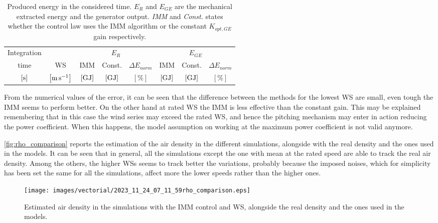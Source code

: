 \begin{table}[!htbp]
  \caption{Produced energy in the considered time. $E_R$ and $E_{GE}$ are the mechanical extracted energy and the generator output. \textit{IMM} and \textit{Const.} states whether the control law uses the IMM algorithm or the constant $K_{opt,GE}$ gain respectively.}
  \centering
  \begin{tabular}{cc|ccc|ccc}
    \toprule
    Integration & & \multicolumn{3}{c|}{$E_R$} & \multicolumn{3}{c}{$E_{GE}$}\\
    time & WS & IMM & Const. & $\Delta E_{norm}$ & IMM & Const. & $\Delta E_{norm}$\\
    $\left[\si{\second}\right]$ & $\left[\si{\meter\per\second}\right]$ & $\left[\si{\giga\joule}\right]$ &   $\left[\si{\giga\joule}\right]$ & $\left[\%\right]$& $\left[\si{\giga\joule}\right]$ &   $\left[\si{\giga\joule}\right]$ & $\left[\%\right]$ \\
    \midrule
    
  \end{tabular}
  \label{tab:comparison_IMM}
\end{table}

From the numerical values of the error, it can be seen that the difference between the methods for the lowest WS are small, even tough the IMM seems to perform better. On the other hand at rated WS the IMM is less effective than the constant gain. This may be explained remembering that in this case the wind series may exceed the rated WS, and hence the pitching mechanism may enter in action reducing the power coefficient. When this happens, the model assumption on working at the maximum power coefficient is not valid anymore.

\autoref{fig:rho_comparison} reports the estimation of the air density in the different simulations, alongside with the real density and the ones used in the models. It can be seen that in general, all the simulations except the one with mean at the rated speed are able to track the real air density. Among the others, the higher WSs seems to track better the variations, probably because the imposed noises, which for simplicity has been set the same for all the simulations, affect more the lower speeds rather than the higher ones.
\begin{figure}[!htbp]
  \centering
  \texttt{[image: images/vectorial/2023\_11\_24\_07\_11\_59rho\_comparison.eps]}
  \caption{Estimated air density in the simulations with the IMM control and WS, alongside the real density and the ones used in the models.}
  \label{fig:rho_comparison}
\end{figure}

